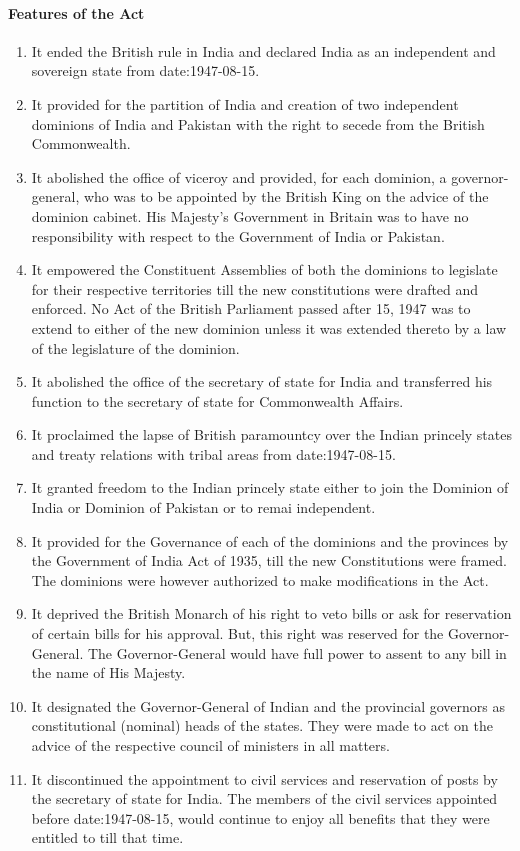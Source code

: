 \begin{multicol}{2}
\paragraph{Features of the Act}
\begin{enumerate}
  \item It ended the British rule in India and declared India as an independent and sovereign state from \gls{date:1947-08-15}.
  \item It provided for the partition of India and creation of two independent dominions of India and Pakistan with the right to secede from the British Commonwealth.
  \item It abolished the office of viceroy and provided, for each dominion, a governor-general, who was to be appointed by the British King on the advice of the dominion cabinet. His Majesty's Government in Britain was to have no responsibility with respect to the Government of India or Pakistan.
  \item It empowered the Constituent Assemblies of both the dominions to legislate for their respective territories till the new constitutions were drafted and enforced. No Act of the British Parliament passed after 15, 1947 was to extend to either of the new dominion unless it was extended thereto by a law of the legislature of the dominion.
  \item It abolished the office of the secretary of state for India and transferred his function to the secretary of state for Commonwealth Affairs.
  \item It proclaimed the lapse of British paramountcy over the Indian princely states and treaty relations with tribal areas from \gls{date:1947-08-15}.
  \item It granted freedom to the Indian princely state either to join the Dominion of India or Dominion of Pakistan or to remai independent.
  \item It provided for the Governance of each of the dominions and the provinces by the Government of India Act of 1935, till the new Constitutions were framed. The dominions were however authorized to make modifications in the Act.
  \item It deprived the British Monarch of his right to veto bills or ask for reservation of certain bills for his approval. But, this right was reserved for the Governor-General. The Governor-General would have full power to assent to any bill in the name of His Majesty.
  \item It designated the Governor-General of Indian and the provincial governors as constitutional (nominal) heads of the states. They were made to act on the advice of the respective council of ministers in all matters.
  \item It discontinued the appointment to civil services and reservation of posts by the secretary of state for India. The members of the civil services appointed before \gls{date:1947-08-15}, would continue to enjoy all benefits that they were entitled to till that time.
\end{enumerate}


\end{multicol}
